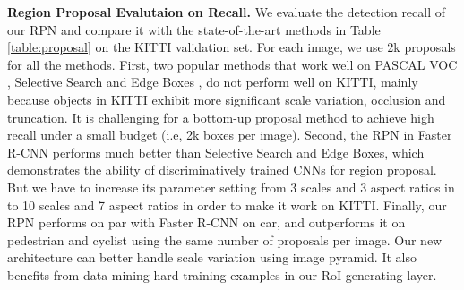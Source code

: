\documentclass[10pt,twocolumn,letterpaper]{article}
\begin{document}
\noindent \textbf{Region Proposal Evalutaion on Recall.} We evaluate the detection recall of our RPN and compare it with the state-of-the-art methods in Table \ref{table:proposal} on the KITTI validation set. For each image, we use 2k proposals for all the methods. First, two popular methods that work well on PASCAL VOC \cite{pascal-voc-2012}, Selective Search \cite{uijlings2013selective} and Edge Boxes \cite{zitnick2014edge}, do not perform well on KITTI, mainly because objects in KITTI exhibit more significant scale variation, occlusion and truncation. It is challenging for a bottom-up proposal method to achieve high recall under a small budget (i.e, 2k boxes per image). Second, the RPN in Faster R-CNN \cite{ren2015faster} performs much better than Selective Search and Edge Boxes, which demonstrates the ability of discriminatively trained CNNs for region proposal. But we have to increase its parameter setting from 3 scales and 3 aspect ratios in \cite{ren2015faster} to 10 scales and 7 aspect ratios in order to make it work on KITTI. Finally, our RPN performs on par with Faster R-CNN on car, and outperforms it on pedestrian and cyclist using the same number of proposals per image. Our new architecture can better handle scale variation using image pyramid. It also benefits from data mining hard training examples in our RoI generating layer.
\end{document}
